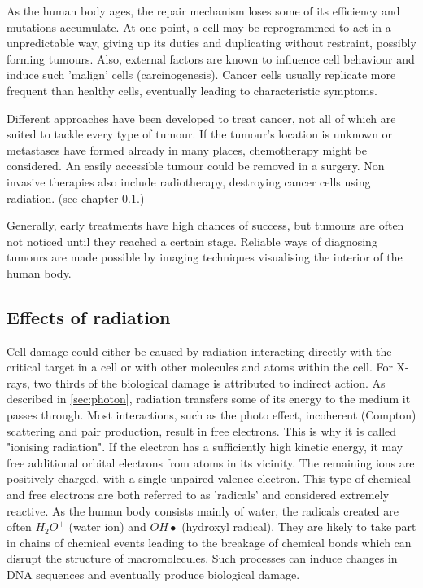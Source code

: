 As the human body ages, the repair mechanism loses some of its efficiency and mutations accumulate.
At one point, a cell may be reprogrammed to act in a unpredictable way, giving up its duties and duplicating without restraint, possibly forming tumours.
Also, external factors are known to influence cell behaviour and induce such 'malign' cells (carcinogenesis).
Cancer cells usually replicate more frequent than healthy cells, eventually leading to characteristic symptoms.

Different approaches have been developed to treat cancer, not all of which are suited to tackle every type of tumour.
If the tumour's location is unknown or metastases have formed already in many places, chemotherapy might be considered.
An easily accessible tumour could be removed in a surgery.
Non invasive therapies also include radiotherapy, destroying cancer cells using radiation. (see chapter \ref{sec:irradiate}.)

Generally, early treatments have high chances of success, but tumours are often not noticed until they reached a certain stage. 
Reliable ways of diagnosing tumours are made possible by imaging techniques visualising the interior of the human body. \cite{Baumann2017, Basic Clinical Radiobiology (4th edition)}

\subsection{Effects of radiation}
\label{sec:irradiate}

Cell damage could either be caused by radiation interacting directly with the critical target in a cell or with other molecules and atoms within the cell.
For X-rays, two thirds of the biological damage is attributed to indirect action.
As described in \ref{sec:photon}, radiation transfers some of its energy to the medium it passes through.
Most interactions, such as the photo effect, incoherent (Compton) scattering and pair production, result in free electrons.
This is why it is called "ionising radiation".
If the electron has a sufficiently high kinetic energy, it may free additional orbital electrons from atoms in its vicinity.
The remaining ions are positively charged, with a single unpaired valence electron.
This type of chemical and free electrons are both referred to as 'radicals' and considered extremely reactive.
As the human body consists mainly of water, the radicals created are often $H_2O^+$ (water ion) and $OH \bullet$ (hydroxyl radical).
They are likely to take part in chains of chemical events leading to the breakage of chemical bonds which can disrupt the structure of macromolecules.
Such processes can induce changes in DNA sequences and eventually produce biological damage. \\

